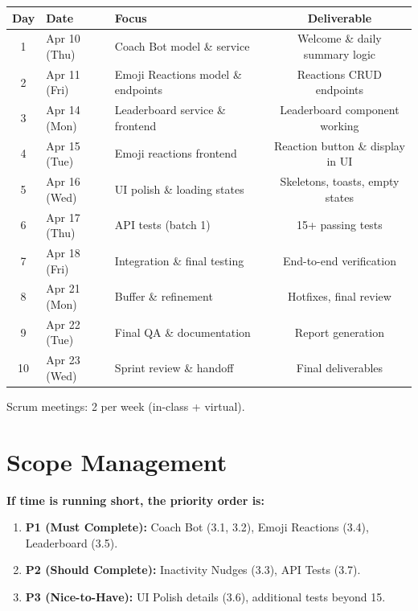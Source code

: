 \documentclass[11pt]{article}
\begin{document}
\begin{center}
\begin{tabularx}{\textwidth}{@{}clXc@{}}
\toprule
\textbf{Day} & \textbf{Date} & \textbf{Focus} & \textbf{Deliverable} \\
\midrule
1 & Apr 10 (Thu) & Coach Bot model \& service & Welcome \& daily summary logic \\
2 & Apr 11 (Fri) & Emoji Reactions model \& endpoints & Reactions CRUD endpoints \\
3 & Apr 14 (Mon) & Leaderboard service \& frontend & Leaderboard component working \\
4 & Apr 15 (Tue) & Emoji reactions frontend & Reaction button \& display in UI \\
5 & Apr 16 (Wed) & UI polish \& loading states & Skeletons, toasts, empty states \\
6 & Apr 17 (Thu) & API tests (batch 1) & 15+ passing tests \\
7 & Apr 18 (Fri) & Integration \& final testing & End-to-end verification \\
8 & Apr 21 (Mon) & Buffer \& refinement & Hotfixes, final review \\
9 & Apr 22 (Tue) & Final QA \& documentation & Report generation \\
10 & Apr 23 (Wed) & Sprint review \& handoff & Final deliverables \\
\bottomrule
\end{tabularx}
\end{center}

Scrum meetings: 2 per week (in-class + virtual).

\section{Scope Management}

\textbf{If time is running short, the priority order is:}

\begin{enumerate}[leftmargin=1.5em]
    \item \textbf{P1 (Must Complete):} Coach Bot (3.1, 3.2), Emoji Reactions (3.4), Leaderboard (3.5).
    \item \textbf{P2 (Should Complete):} Inactivity Nudges (3.3), API Tests (3.7).
    \item \textbf{P3 (Nice-to-Have):} UI Polish details (3.6), additional tests beyond 15.
\end{enumerate}
\end{document}
